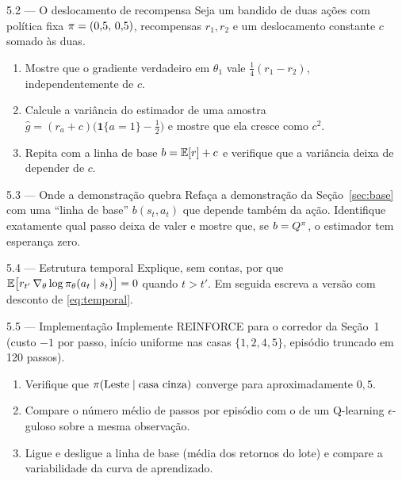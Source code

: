 \documentclass[11pt]{article}
\newcommand{\thv}{\theta}
\newcommand{\polth}{\pol_{\thv}}
\newcommand{\gth}{\nabla_{\thv}}
\begin{document}
\begin{exbox}{5.2 --- O deslocamento de recompensa}
Seja um bandido de duas ações com política fixa $\pi=(0{,}5,\,0{,}5)$,
recompensas $r_1,r_2$ e um deslocamento constante $c$ somado às duas.
\begin{enumerate}[label=(\alph*), itemsep=0.1em]
  \item Mostre que o gradiente verdadeiro em $\thv_1$ vale
    $\tfrac14 (r_1-r_2)$, independentemente de $c$.
  \item Calcule a variância do estimador de uma amostra
    $\hat g = (r_a+c)\bigl(\mathbf{1}\{a=1\}-\tfrac12\bigr)$ e mostre que ela
    cresce como $c^2$.
  \item Repita com a linha de base $b=\mathbb{E}[r]+c$ e verifique que a variância deixa
    de depender de $c$.
\end{enumerate}
\end{exbox}

\begin{exbox}{5.3 --- Onde a demonstração quebra}
Refaça a demonstração da Seção~\ref{sec:base} com uma ``linha de base''
$b(s_t,a_t)$ que depende também da ação. Identifique exatamente qual passo
deixa de valer e mostre que, se $b = Q^{\pi}$, o estimador tem esperança zero.
\end{exbox}

\begin{exbox}{5.4 --- Estrutura temporal}
Explique, sem contas, por que $\E\bigl[r_{t'}\,\gth\log\polth(a_t\mid s_t)\bigr]=0$
quando $t > t'$. Em seguida escreva a versão com desconto de \eqref{eq:temporal}.
\end{exbox}

\begin{exbox}{5.5 --- Implementação}
Implemente REINFORCE para o corredor da Seção~1 (custo $-1$ por passo, início
uniforme nas casas $\{1,2,4,5\}$, episódio truncado em 120 passos).
\begin{enumerate}[label=(\alph*), itemsep=0.1em]
  \item Verifique que $\pi(\text{Leste}\mid\text{casa cinza})$ converge para
    aproximadamente $0{,}5$.
  \item Compare o número médio de passos por episódio com o de um Q-learning
    $\epsilon$-guloso sobre a mesma observação.
  \item Ligue e desligue a linha de base (média dos retornos do lote) e compare
    a variabilidade da curva de aprendizado.
\end{enumerate}
\end{exbox}
\end{document}
